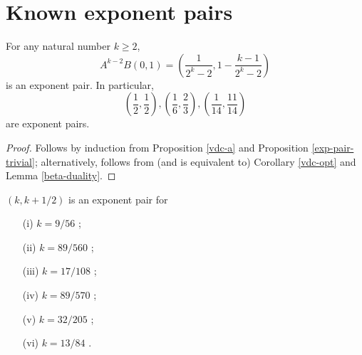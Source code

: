 \section{Known exponent pairs}


\begin{proposition}\label{vdc-class} For any natural number $k \geq 2$,
    $$ A^{k-2} B(0,1) = \left( \frac{1}{2^k-2}, 1 - \frac{k-1}{2^k-2} \right)$$
    is an exponent pair.  In particular,
    $$ \left(\frac{1}{2}, \frac{1}{2}\right), \left(\frac{1}{6}, \frac{2}{3}\right), \left(\frac{1}{14}, \frac{11}{14}\right)$$
    are exponent pairs.
    \end{proposition}

    \begin{proof} Follows by induction from Proposition \ref{vdc-a} and Proposition \ref{exp-pair-trivial}; alternatively, follows from (and is equivalent to) Corollary \ref{vdc-opt} and Lemma \ref{beta-duality}.
    \end{proof}

\derived
{}

\begin{theorem}\label{line-sym} $(k,k+1/2)$ is an exponent pair for
\begin{itemize}
\item[(i)] $k = 9/56$ \cite[Theorem~1]{huxley_exponential_1988};
\item[(ii)] $k=89/560$ \cite[Theorem~6]{watt_exponential_1989};
\item[(iii)] $k=17/108$ \cite[p. 467]{huxley_exponential_1991};
\item[(iv)] $k=89/570$ \cite[p. 40]{huxley_exponential_1993};
\item[(v)] $k=32/205$ \cite[Theorem~1]{huxley_exponential_2005};
\item[(vi)] $k=13/84$ \cite[p. 206]{bourgain_decoupling_2017}.
\end{itemize}
\end{theorem}

\literature
{}


